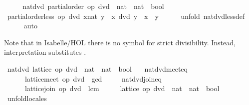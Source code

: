 \begin{isabellebody}
\ \ \isamarkupfalse%
\ \isamarkupfalse%
\ nat{\isacharunderscore}dvd{\isacharcolon}\ partial{\isacharunderscore}order\ {\isachardoublequoteopen}op\ dvd\ {\isacharcolon}{\isacharcolon}\ nat\ {\isasymRightarrow}\ nat\ {\isasymRightarrow}\ bool{\isachardoublequoteclose}\ \isacommand{{\isachardot}}\isamarkupfalse%
\isanewline
\ \ \isamarkupfalse%
\ {\isachardoublequoteopen}partial{\isacharunderscore}order{\isachardot}less\ op\ dvd\ {\isacharparenleft}x{\isacharcolon}{\isacharcolon}nat{\isacharparenright}\ y\ {\isacharequal}\ {\isacharparenleft}x\ dvd\ y\ {\isasymand}\ x\ {\isasymnoteq}\ y{\isacharparenright}{\isachardoublequoteclose}\isanewline
\ \ \ \ \isamarkupfalse%
\ {\isacharparenleft}unfold\ nat{\isacharunderscore}dvd{\isachardot}less{\isacharunderscore}def{\isacharparenright}\isanewline
\ \ \ \ \isamarkupfalse%
\ auto\isanewline
\ \ \ \ \isamarkupfalse%
\isanewline
{}\isamarkupfalse%
%
\endisatagproof
{\isafoldproof}%
%
\isadelimproof
%
\endisadelimproof
%
\begin{isamarkuptext}%
Note that in Isabelle/HOL there is no symbol for strict
  divisibility.  Instead, interpretation substitutes .%
\end{isamarkuptext}%
\isamarkuptrue%
\isamarkupfalse%
\ nat{\isacharunderscore}dvd{\isacharbang}{\isacharcolon}\ lattice\ {\isachardoublequoteopen}op\ dvd\ {\isacharcolon}{\isacharcolon}\ nat\ {\isasymRightarrow}\ nat\ {\isasymRightarrow}\ bool{\isachardoublequoteclose}\isanewline
\ \ \ nat{\isacharunderscore}dvd{\isacharunderscore}meet{\isacharunderscore}eq{\isacharcolon}\isanewline
\ \ \ \ \ \ {\isachardoublequoteopen}lattice{\isachardot}meet\ op\ dvd\ {\isacharequal}\ gcd{\isachardoublequoteclose}\isanewline
\ \ \ \ \ nat{\isacharunderscore}dvd{\isacharunderscore}join{\isacharunderscore}eq{\isacharcolon}\isanewline
\ \ \ \ \ \ {\isachardoublequoteopen}lattice{\isachardot}join\ op\ dvd\ {\isacharequal}\ lcm{\isachardoublequoteclose}\isanewline
%
\isadelimproof
%
\endisadelimproof
%
\isatagproof
{}\isamarkupfalse%
\ {\isacharminus}\isanewline
\ \ \isamarkupfalse%
\ {\isachardoublequoteopen}lattice\ {\isacharparenleft}op\ dvd\ {\isacharcolon}{\isacharcolon}\ nat\ {\isasymRightarrow}\ nat\ {\isasymRightarrow}\ bool{\isacharparenright}{\isachardoublequoteclose}\isanewline
\ \ \ \ \isamarkupfalse%
\ unfold{\isacharunderscore}locales\isanewline

\end{isabellebody}
